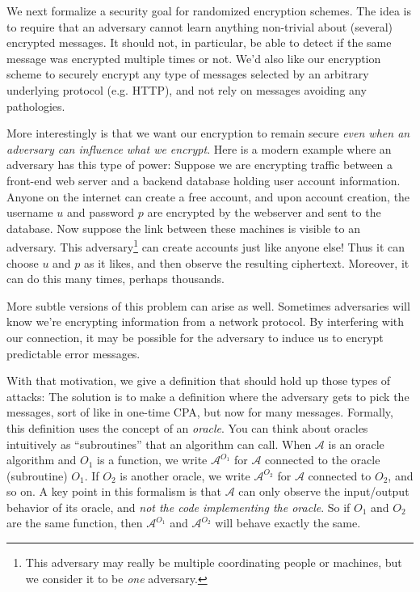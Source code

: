 \documentclass[11pt]{article}
\newcommand{\calA}{\mathcal{A}}
\begin{document}
We next formalize a security goal for randomized encryption schemes. The idea
is to require that an adversary cannot learn anything non-trivial about
(several) encrypted messages. It should not, in particular, be able to detect
if the same message was encrypted multiple times or not. We'd also like our
encryption scheme to securely encrypt any type of messages selected by an
arbitrary underlying protocol (e.g. HTTP), and not rely on messages avoiding
any pathologies.

More interestingly is that we want our encryption to remain secure \emph{even
when an adversary can influence what we encrypt}. Here is a modern example
where an adversary has this type of power: Suppose we are encrypting traffic
between a front-end web server and a backend database holding user account
information. Anyone on the internet can create a free account, and upon account
creation, the username $u$ and password $p$ are encrypted by the webserver and
sent to the database. Now suppose the link between these machines is visible to
an adversary. This adversary\footnote{This adversary may really be multiple
coordinating people or machines, but we consider it to be \emph{one} adversary.}
can create accounts just like anyone else! Thus it can choose $u$ and $p$ as it
likes, and then observe the resulting ciphertext. Moreover, it can do this many
times, perhaps thousands.

More subtle versions of this problem can arise as well. Sometimes adversaries
will know we're encrypting information from a network protocol. By interfering
with our connection, it may be possible for the adversary to induce us to
encrypt predictable error messages.

With that motivation, we give a definition that should hold up those types
of attacks: The solution is to make a definition where the adversary gets
to pick the messages, sort of like in one-time CPA, but now for many
messages. Formally, this definition uses the concept of an \emph{oracle}.
You can think about oracles intuitively as ``subroutines'' that an
algorithm can call. When $\calA$ is an oracle algorithm and $O_1$ is a
function, we write $\calA^{O_1}$ for $\calA$ connected to the oracle
(subroutine) $O_1$. If $O_2$ is another oracle, we write $\calA^{O_2}$ for
$\calA$ connected to $O_2$, and so on.  A key point in this formalism is that
$\calA$ can only observe the input/output behavior of its oracle, and \emph{not
the code implementing the oracle}.  So if $O_1$ and $O_2$ are the same
function, then $\calA^{O_1}$ and $\calA^{O_2}$ will behave exactly the same. 
\end{document}
